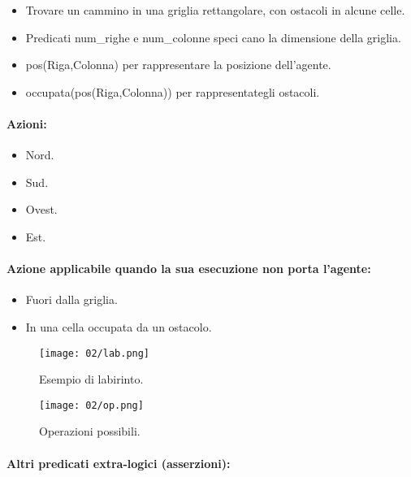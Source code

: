 \begin{itemize}
  \item Trovare un cammino in una griglia rettangolare, con
ostacoli in alcune celle. 
\item Predicati num\_righe e num\_colonne speci cano la
dimensione della griglia. 
\item pos(Riga,Colonna) per rappresentare la posizione
dell’agente. 
\item occupata(pos(Riga,Colonna)) per rappresentategli ostacoli.
\end{itemize}

\paragraph{Azioni:}

\begin{itemize}
  \item Nord. 
  \item Sud. 
  \item Ovest. 
  \item Est. 
\end{itemize}

\paragraph{Azione applicabile quando la sua esecuzione non porta l’agente:}

\begin{itemize}
  \item Fuori dalla griglia. 
  \item In una cella occupata da un ostacolo.
\end{itemize}

\begin{figure}[h]
    \centering
    \texttt{[image: 02/lab.png]}
    \caption{Esempio di labirinto.}
\end{figure}

\begin{figure}[h]
    \centering
    \texttt{[image: 02/op.png]}
    \caption{Operazioni possibili.}
\end{figure}

\paragraph{Altri predicati extra-logici (asserzioni):}

